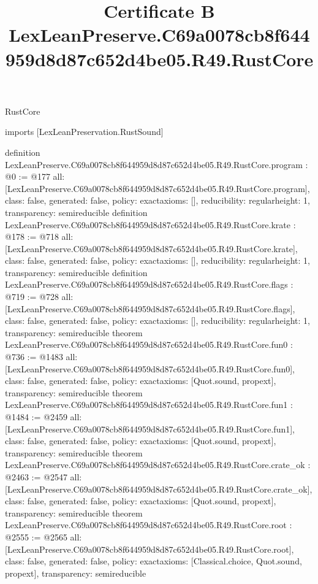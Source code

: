 \begin{lexlean}{RustCore}
\title{Certificate B LexLeanPreserve.C69a0078cb8f644959d8d87c652d4be05.R49.RustCore}
\begin{coremodule}
imports [LexLeanPreservation.RustSound]

definition LexLeanPreserve.C69a0078cb8f644959d8d87c652d4be05.R49.RustCore.program : @0 := @177 {
  all: [LexLeanPreserve.C69a0078cb8f644959d8d87c652d4be05.R49.RustCore.program],
  class: false,
  generated: false,
  policy: exact{axioms: []},
  reducibility: regular{height: 1},
  transparency: semireducible
}
definition LexLeanPreserve.C69a0078cb8f644959d8d87c652d4be05.R49.RustCore.krate : @178 := @718 {
  all: [LexLeanPreserve.C69a0078cb8f644959d8d87c652d4be05.R49.RustCore.krate],
  class: false,
  generated: false,
  policy: exact{axioms: []},
  reducibility: regular{height: 1},
  transparency: semireducible
}
definition LexLeanPreserve.C69a0078cb8f644959d8d87c652d4be05.R49.RustCore.flags : @719 := @728 {
  all: [LexLeanPreserve.C69a0078cb8f644959d8d87c652d4be05.R49.RustCore.flags],
  class: false,
  generated: false,
  policy: exact{axioms: []},
  reducibility: regular{height: 1},
  transparency: semireducible
}
theorem LexLeanPreserve.C69a0078cb8f644959d8d87c652d4be05.R49.RustCore.fun0 : @736 := @1483 {
  all: [LexLeanPreserve.C69a0078cb8f644959d8d87c652d4be05.R49.RustCore.fun0],
  class: false,
  generated: false,
  policy: exact{axioms: [Quot.sound, propext]},
  transparency: semireducible
}
theorem LexLeanPreserve.C69a0078cb8f644959d8d87c652d4be05.R49.RustCore.fun1 : @1484 := @2459 {
  all: [LexLeanPreserve.C69a0078cb8f644959d8d87c652d4be05.R49.RustCore.fun1],
  class: false,
  generated: false,
  policy: exact{axioms: [Quot.sound, propext]},
  transparency: semireducible
}
theorem LexLeanPreserve.C69a0078cb8f644959d8d87c652d4be05.R49.RustCore.crate_ok : @2463 := @2547 {
  all: [LexLeanPreserve.C69a0078cb8f644959d8d87c652d4be05.R49.RustCore.crate_ok],
  class: false,
  generated: false,
  policy: exact{axioms: [Quot.sound, propext]},
  transparency: semireducible
}
theorem LexLeanPreserve.C69a0078cb8f644959d8d87c652d4be05.R49.RustCore.root : @2555 := @2565 {
  all: [LexLeanPreserve.C69a0078cb8f644959d8d87c652d4be05.R49.RustCore.root],
  class: false,
  generated: false,
  policy: exact{axioms: [Classical.choice, Quot.sound, propext]},
  transparency: semireducible
}


\end{coremodule}
\end{lexlean}
